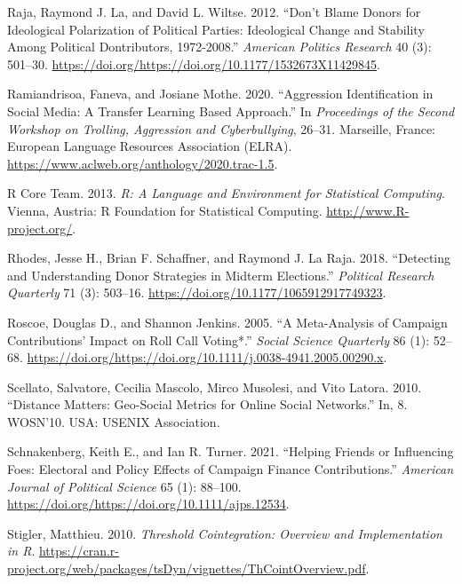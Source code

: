 \documentclass[12pt,]{article}
\begin{document}
\leavevmode\hypertarget{ref-laraja2012}{}%
Raja, Raymond J. La, and David L. Wiltse. 2012. ``Don't Blame Donors for
Ideological Polarization of Political Parties: Ideological Change and
Stability Among Political Dontributors, 1972-2008.'' \emph{American
Politics Research} 40 (3): 501--30.
\url{https://doi.org/https://doi.org/10.1177/1532673X11429845}.

\leavevmode\hypertarget{ref-ramiandrisoa2020}{}%
Ramiandrisoa, Faneva, and Josiane Mothe. 2020. ``Aggression
Identification in Social Media: A Transfer Learning Based Approach.'' In
\emph{Proceedings of the Second Workshop on Trolling, Aggression and
Cyberbullying}, 26--31. Marseille, France: European Language Resources
Association (ELRA).
\url{https://www.aclweb.org/anthology/2020.trac-1.5}.

\leavevmode\hypertarget{ref-r}{}%
R Core Team. 2013. \emph{R: A Language and Environment for Statistical
Computing}. Vienna, Austria: R Foundation for Statistical Computing.
\url{http://www.R-project.org/}.

\leavevmode\hypertarget{ref-rhodes2018}{}%
Rhodes, Jesse H., Brian F. Schaffner, and Raymond J. La Raja. 2018.
``Detecting and Understanding Donor Strategies in Midterm Elections.''
\emph{Political Research Quarterly} 71 (3): 503--16.
\url{https://doi.org/10.1177/1065912917749323}.

\leavevmode\hypertarget{ref-roscoe2005}{}%
Roscoe, Douglas D., and Shannon Jenkins. 2005. ``A Meta-Analysis of
Campaign Contributions' Impact on Roll Call Voting*.'' \emph{Social
Science Quarterly} 86 (1): 52--68.
\url{https://doi.org/https://doi.org/10.1111/j.0038-4941.2005.00290.x}.

\leavevmode\hypertarget{ref-scellato2010}{}%
Scellato, Salvatore, Cecilia Mascolo, Mirco Musolesi, and Vito Latora.
2010. ``Distance Matters: Geo-Social Metrics for Online Social
Networks.'' In, 8. WOSN'10. USA: USENIX Association.

\leavevmode\hypertarget{ref-schnakenberg2021}{}%
Schnakenberg, Keith E., and Ian R. Turner. 2021. ``Helping Friends or
Influencing Foes: Electoral and Policy Effects of Campaign Finance
Contributions.'' \emph{American Journal of Political Science} 65 (1):
88--100. \url{https://doi.org/https://doi.org/10.1111/ajps.12534}.

\leavevmode\hypertarget{ref-tsdyn}{}%
Stigler, Matthieu. 2010. \emph{Threshold Cointegration: Overview and
Implementation in R}.
\url{https://cran.r-project.org/web/packages/tsDyn/vignettes/ThCointOverview.pdf}.
\end{document}
